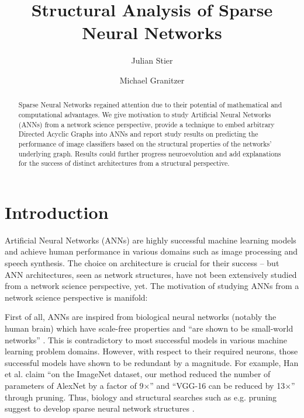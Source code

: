 \documentclass[runningheads]{llncs}
\begin{document}
\title{Structural Analysis of Sparse Neural Networks}
\author{Julian Stier \and Michael Granitzer}

\maketitle


\begin{abstract}
Sparse Neural Networks regained attention due to their potential of mathematical and computational advantages.
We give motivation to study Artificial Neural Networks (ANNs) from a network science perspective, provide a technique to embed arbitrary Directed Acyclic Graphs into ANNs and report study results on predicting the performance of image classifiers based on the structural properties of the networks' underlying graph.
Results could further progress neuroevolution and add explanations for the success of distinct architectures from a structural perspective.
\end{abstract}




\section{Introduction}\label{sec:introduction}
Artificial Neural Networks (ANNs) are highly successful machine learning models and achieve human performance in various domains such as image processing and speech synthesis.
The choice on architecture is crucial for their success -- but ANN architectures, seen as network structures, have not been extensively studied from a network science perspective, yet.
The motivation of studying ANNs from a network science perspective is manifold:

First of all, ANNs are inspired from biological neural networks (notably the human brain) which have scale-free properties and ``are shown to be small-world networks'' \cite{watts1998collective}.
This is contradictory to most successful models in various machine learning problem domains.
However, with respect to their required neurons, those successful models have shown to be redundant by a magnitude.
For example, Han et al. claim ``on the ImageNet dataset, our method reduced the number of parameters of AlexNet by a factor of 9$\times$'' and ``VGG-16 can be reduced by 13$\times$'' \cite{han2015learning} through pruning.
Thus, biology and structural searches such as e.g. pruning suggest to develop sparse neural network structures \cite{stier2018analysing}.
\end{document}
